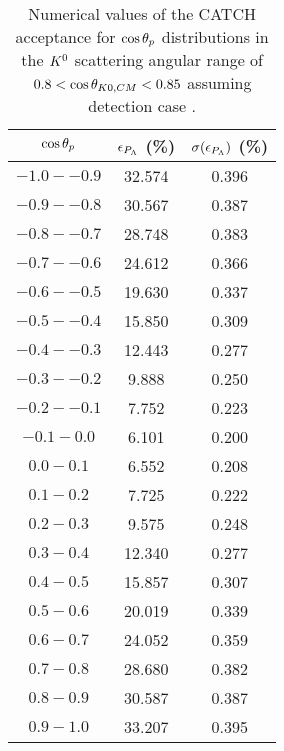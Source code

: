 \begin{table}[!h] 
  \begin{center}
  \caption{Numerical values of the CATCH acceptance for $\cos{\theta_p}$ distributions in the $K^{0}$ scattering angular range of \textbf{$0.8<\cos{\theta_{K0,CM}}<0.85$} assuming detection case .}
  \centering
  \begin{threeparttable}
    \begin{tabular}{ccc}
    $\cos{\theta_p}$ & $\epsilon_{P_{\Lambda}}$ (\%) & $\sigma(\epsilon_{P_{\Lambda}})$ (\%) \\
    \midrule\midrule
    $-1.0 - -0.9$ & 32.574 & 0.396 \\
    \midrule
    $-0.9 - -0.8$ & 30.567 & 0.387 \\
    \midrule
    $-0.8 - -0.7$ & 28.748 & 0.383 \\
    \midrule
    $-0.7 - -0.6$ & 24.612 & 0.366 \\
    \midrule
    $-0.6 - -0.5$ & 19.630 & 0.337 \\
    \midrule
    $-0.5 - -0.4$ & 15.850 & 0.309 \\
    \midrule
    $-0.4 - -0.3$ & 12.443 & 0.277 \\
    \midrule
    $-0.3 - -0.2$ & 9.888 & 0.250 \\
    \midrule
    $-0.2 - -0.1$ & 7.752 & 0.223 \\
    \midrule
    $-0.1 - 0.0$ & 6.101 & 0.200 \\
    \midrule
    $0.0 - 0.1$ & 6.552 & 0.208 \\
    \midrule
    $0.1 - 0.2$ & 7.725 & 0.222 \\
    \midrule
    $0.2 - 0.3$ & 9.575 & 0.248 \\
    \midrule
    $0.3 - 0.4$ & 12.340 & 0.277 \\
    \midrule
    $0.4 - 0.5$ & 15.857 & 0.307 \\
    \midrule
    $0.5 - 0.6$ & 20.019 & 0.339 \\
    \midrule
    $0.6 - 0.7$ & 24.052 & 0.359 \\
    \midrule
    $0.7 - 0.8$ & 28.680 & 0.382 \\
    \midrule
    $0.8 - 0.9$ & 30.587 & 0.387 \\
    \midrule
    $0.9 - 1.0$ & 33.207 & 0.395 \\
    \end{tabular}
  \end{threeparttable}
  \label{tab-Pl-acc_36}
  \end{center}
\end{table}

